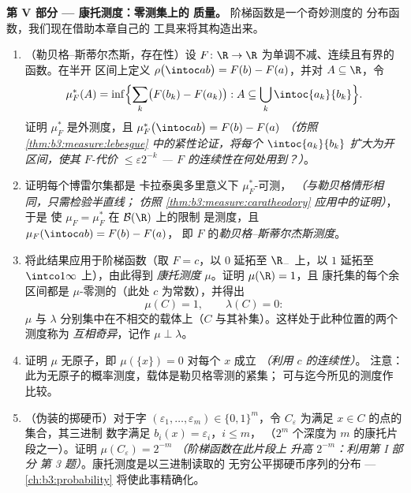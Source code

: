 \begin{problem}
\medskip
\noindent\textbf{第 V 部分 --- 康托测度：零测集上的
质量。} 阶梯函数是一个奇妙测度的
分布函数，我们现在借助本章自己的
工具来将其构造出来。
\begin{enumerate}[resume]
  \item （勒贝格–斯蒂尔杰斯，存在性）设 $F\colon\R\to\R$
        为单调不减、连续且有界的函数。在半开
        区间上定义 $\rho\bigl(\intoc ab\bigr) = F(b) -
        F(a)$，并对 $A \subseteq \R$，令
        \[
        \mu_F^*(A) = \inf\Bigl\{\sum_k\bigl(F(b_k) -
        F(a_k)\bigr) : A \subseteq
        \bigcup_k\intoc{a_k}{b_k}\Bigr\} .
        \]
        证明 $\mu_F^*$ 是外测度，且
        $\mu_F^*\bigl(\intoc ab\bigr) = F(b) - F(a)$
        \emph{（仿照
        \cref{thm:b3:measure:lebesgue} 中的紧性论证，将每个
        $\intoc{a_k}{b_k}$ 扩大为开区间，使其
        $F$-代价 $\leq \varepsilon2^{-k}$ ---
        $F$ 的连续性在何处用到？）}。
  \item 证明每个博雷尔集都是
        卡拉泰奥多里意义下 $\mu_F^*$-可测，
        \emph{（与勒贝格情形相同，只需检验半直线；
        仿照
        \cref{thm:b3:measure:caratheodory} 应用中的证明）}，于是
        使 $\mu_F = \mu_F^*$ 在 $\mathcal B(\R)$ 上的限制
        是测度，且 $\mu_F(\intoc ab) = F(b) - F(a)$，
        即 $F$ 的\emph{勒贝格–斯蒂尔杰斯测度}。
  \item 将此结果应用于阶梯函数（取 $F = c$，以 $0$ 延拓至 $\R_-$
        上，以 $1$ 延拓至 $\intco1\infty$ 上），由此得到
        \emph{康托测度} $\mu$。证明 $\mu(\R) = 1$，且
        康托集的每个余区间都是 $\mu$-零测的（此处 $c$
        为常数），并得出
        \[
        \mu(C) = 1, \qquad \lambda(C) = 0 :
        \]
        $\mu$ 与 $\lambda$ 分别集中在不相交的载体上（$C$
        与其补集）。这样处于此种位置的两个测度称为
        \emph{互相奇异}，记作 $\mu \perp
        \lambda$。
  \item 证明 $\mu$ 无原子，即 $\mu(\{x\}) = 0$
        对每个 $x$ 成立 \emph{（利用 $c$ 的连续性）}。
        注意：此为无原子的概率测度，载体是勒贝格零测的紧集；
        可与迄今所见的测度作比较。
  \item （伪装的掷硬币）对于字 $(\varepsilon_1,
        \dots, \varepsilon_m) \in \{0,1\}^m$，令
        $C_{\varepsilon}$ 为满足 $x \in C$ 的点的集合，其三进制
        数字满足 $b_i(x) = \varepsilon_i$，$i \leq m$，
        （$2^m$ 个深度为 $m$ 的康托片段之一）。证明
        $\mu(C_\varepsilon) = 2^{-m}$ \emph{（阶梯函数在此片段上
        升高 $2^{-m}$：利用第 I 部分
        第 3 题）}。康托测度是以三进制读取的
        无穷公平掷硬币序列的分布
        --- \cref{ch:b3:probability} 将使此事精确化。

\end{enumerate}
\end{problem}
